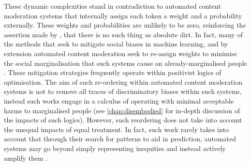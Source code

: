 These dynamic complexities stand in contradiction to automated content moderation systems that internally assign each token a weight and a probability externally. These weights and probabilities are unlikely to be zero, reinforcing the assertion made by \citet{Douglas:1966}, that there is no such thing as absolute dirt. In fact, many of the methods that seek to mitigate social biases in machine learning, and by extension automated content moderation seek to re-assign weights to minimise the social marginalisation that such systems cause on already-marginalised people \cite{Liu:2019}. These mitigation strategies frequently operate within positivist logics of optimisation. The aim of such re-ordering within automated content moderation systems is not to remove all traces of discriminatory biases within such systems, instead such works engage in a calculus of operating with minimal acceptable harms to marginalised people (see \autoref{chap:disembodied} for in-depth discussion of the impacts of such logics). However, such reordering does not take into account the unequal impacts of equal treatment. In fact, such work rarely takes into account that through their search for patterns to aid in prediction, automated systems may go beyond simply representing inequities and instead actively amplify them \citep{Zhao:2017}.\vspace{5mm}

